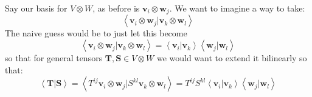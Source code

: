 	Say our basis for $V \otimes W$, as before is $\mathbf v_i \otimes \mathbf w_j$. We want to imagine a way to take:
	\begin{equation*}
		\left< \mathbf v_i \otimes \mathbf w_j | \mathbf v_k \otimes \mathbf w_l \right>
	\end{equation*}
	The naive guess would be to just let this become
	\begin{equation}\label{eq:tensor_inner_product_def}
		\left< \mathbf v_i \otimes \mathbf w_j | \mathbf v_k \otimes \mathbf w_l \right> = \left< \mathbf v_i | \mathbf v_k \right> \left< \mathbf w_j | \mathbf w_l \right> 
	\end{equation}
	so that for general tensors $\mathbf{T}, \mathbf{S} \in V \otimes W$ we would want to extend it bilinearly so that:
	\begin{equation}\label{eq:bilinear_tensor_inner_product}
		\left< \mathbf{T} | \mathbf{S} \right> 
		= \left< T^{ij} \mathbf v_i \otimes \mathbf w_j | S^{kl} \mathbf v_k \otimes \mathbf w_l \right> =  
		T^{ij} S^{kl} \left< \mathbf v_i | \mathbf v_k \right> \left< \mathbf w_j | \mathbf w_l \right> 
	\end{equation}
	

